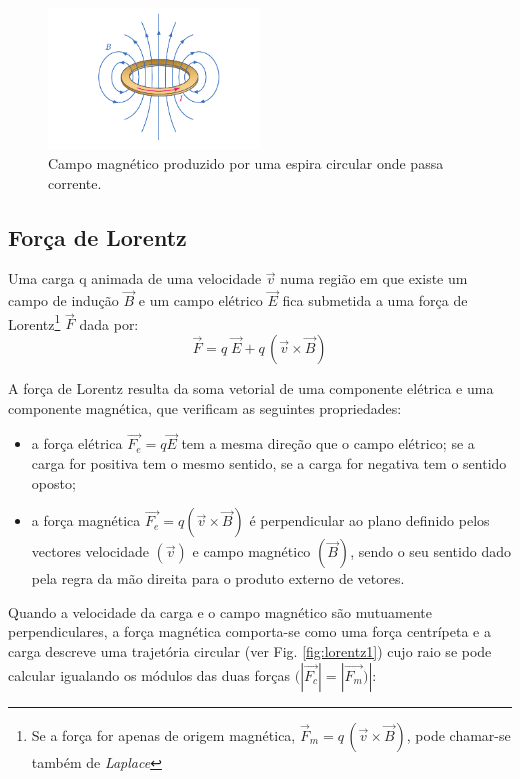\documentclass[12pt,a4paper,oneside]{paper}
\begin{document}
 \begin{figure}[H]
  \centering 
\includegraphics[width=0.5\textwidth]{thomson_images/fig-espira.pdf}
\caption{Campo magnético produzido por uma espira circular onde passa corrente.}
\label{fig:espira1}
\end{figure}

\subsection{\sf Força de Lorentz }
Uma carga q animada de uma velocidade $\vec{v}$ numa região em que existe um campo de indução $\vec{B}$ e um campo
elétrico $\vec{E}$ fica submetida a uma força de Lorentz\footnote{Se a força for apenas de origem magnética, $\vec{F}_m =  q\,(\vec{v} \times \vec{B})$,
pode chamar-se também de \emph{Laplace}} $\vec{F}$ dada por:
\begin{equation}
	\label{eq:Lorentz}
 \vec{F} = q\; \vec{E} + q\,(\vec{v} \times \vec{B})
\end{equation}

A força de Lorentz resulta da soma vetorial de uma componente elétrica e uma componente magnética, que verificam as
seguintes propriedades:
\begin{itemize}
\item a força elétrica $\vec{F_e}=q\vec{E}$ tem a mesma direção que o campo elétrico; se a carga for positiva tem o mesmo
sentido, se a carga for negativa tem o sentido oposto;
\item a força magnética $\vec{F_e}=q(\vec{v} \times \vec{B})$ é perpendicular ao plano definido pelos vectores velocidade $(\vec{v})$
e campo magnético $(\vec{B})$, sendo o seu sentido dado pela regra da mão direita para o produto externo de vetores.
\end{itemize}
Quando a velocidade da carga e o campo magnético são mutuamente perpendiculares, a força magnética comporta-se como uma
força centrípeta e a carga descreve uma trajetória circular (ver Fig. \ref{fig:lorentz1}) cujo raio se pode calcular
igualando os módulos das duas forças $(|\vec{F_c}|=|\vec{F_m})|$:
\end{document}
